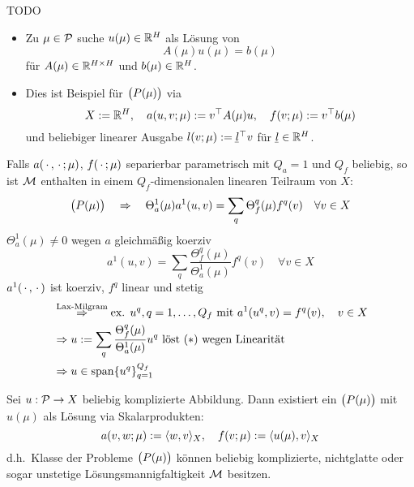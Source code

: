\begin{bsp}
	TODO
\end{bsp}

\begin{bsp}[Matrixgleichung] \beginwithlist
	\begin{itemize}
		\item Zu $\mu \in \mathcal{P}$ suche $u(\mu) \in \mathbb{R}^H$ als Lösung von
			\[
				A(\mu) u(\mu) = b(\mu)
			\]
			für $A(\mu) \in \mathbb{R}^{H \times H}$ und $b(\mu) \in \mathbb{R}^H$.
		\item Dies ist Beispiel für $\big(P(\mu)\big)$ via
			\[
				X := \mathbb{R}^H, \quad a(u,v;\mu) := v^\top A(\mu) u, \quad f(v;\mu) := v^\top b(\mu)
			\]
			und beliebiger linearer Ausgabe $l(v;\mu) := \ubar l^\top v$ für $\ubar l \in \R^H$.
	\end{itemize}
\end{bsp}

\begin{bsp}[$Q_a = 1$]
	Falls $a(\,\cdot\,,\,\cdot\,;\mu)$, $f(\,\cdot\,;\mu)$ separierbar parametrisch mit $Q_a = 1$ und $Q_f$ beliebig, so ist $\mathcal{M}$ enthalten in einem $Q_f$-dimensionalen linearen Teilraum von $X$:
	\[
		\big(P(\mu)\big) \quad \Rightarrow \quad \Theta_a^1(\mu) a^1(u,v) = \sum_q \Theta_f^q(\mu) f^q(v) \quad \forall v \in X
	\]
	$\Theta_a^1(\mu) \neq 0$ wegen $a$ gleichmäßig koerziv
	\[
		a^1(u,v) = \sum_q \frac{\Theta_f^q(\mu)}{\Theta_a^1(\mu)} f^q(v) \quad \forall v \in X \tag{$*$}
	\]
	$a^1(\,\cdot\,,\,\cdot\,)$ ist koerziv, $f^q$ linear und stetig
	\begin{align*}
		&\stackrel{\text{Lax-Milgram}}{\Rightarrow} \text{ex. } u^q, q=1,\dots,Q_f \text{ mit } a^1(u^q,v) = f^q(v), \quad v \in X\\
		&\Rightarrow u := \sum_q \frac{\Theta_f^q(\mu)}{\Theta_a^1(\mu)} u^q \text{ löst } (*) \text{ wegen Linearität}\\
		&\Rightarrow u \in \operatorname{span}\{u^q\}_{q=1}^{Q_f}
	\end{align*}
\end{bsp}

\begin{bsp}
	Sei $u : \mathcal{P} \to X$ beliebig komplizierte Abbildung.
	Dann existiert ein $\big(P(\mu)\big)$ mit $u(\mu)$ als Lösung via Skalarprodukten:
	\[
		a(v,w;\mu) := \langle w, v \rangle_X, \quad f(v;\mu) := \langle u(\mu), v \rangle_X
	\]
	d.h.\ Klasse der Probleme $\big(P(\mu)\big)$ können beliebig komplizierte, nichtglatte oder sogar unstetige Lösungsmannigfaltigkeit $\mathcal{M}$ besitzen.
\end{bsp}

